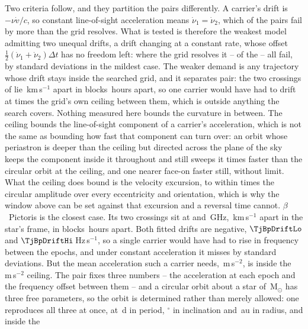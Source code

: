 Two criteria follow, and they partition the pairs differently. A carrier's
drift is $-\nu\dot v/c$, so constant line-of-sight acceleration means
$\dot\nu_1=\dot\nu_2$, which \TjNUneqDrift{} of the \TjNPair{} pairs fail
by more than the grid resolves. What is tested is therefore the weakest model
admitting two unequal drifts, a drift changing at a constant rate, whose
offset $\frac{1}{2}(\dot\nu_1+\dot\nu_2)\Delta t$ has no freedom left:
where the grid resolves it -- \TjNPower{} of the \TjNPair{} -- all
\TjNPower{} fail, by \TjSigMin{} standard deviations in the mildest case. The weaker
demand is any trajectory whose drift stays inside the searched grid, and it
separates \TjNExcl{} pair: the two crossings of \EcGridStar{} lie
\EcGridDvKms\,km\,s$^{-1}$ apart in blocks \EcGridDtH\,hours apart, so one
carrier would have had to drift at \EcGridFactor{} times the grid's own
ceiling between them, which is outside anything the search covers. Nothing
measured here bounds the curvature in between. The ceiling bounds the
line-of-sight component of a carrier's acceleration, which is not the same as
bounding how fast that component can turn over: an orbit whose periastron is
deeper than the ceiling but directed across the plane of the sky keeps the
component inside it throughout and still sweeps it \EcRateSupFac{} times
faster than the circular orbit at the ceiling, and one nearer face-on faster
still, without limit. What the ceiling does bound is the velocity
excursion, to within \EcVsupFac{} times the circular amplitude over every
eccentricity and orientation, which is why the window above can be set against
that excursion and a reversal time cannot.
$\beta$~Pictoris is the closest case. Its two crossings sit at \TjBpNuLo{}
and \TjBpNuHi\,GHz, \TjBpDvKms\,km\,s$^{-1}$ apart in the star's frame, in
blocks \TjBpDtH\,hours apart. Both fitted drifts are negative,
$\TjBpDriftLo$ and $\TjBpDriftHi$\,Hz\,s$^{-1}$, so a single carrier would
have had to rise in frequency between the epochs, and under constant
acceleration it misses by \TjBpNSig{} standard deviations. But the mean
acceleration such a carrier needs, \TjBpAccelReq\,m\,s$^{-2}$, is inside the
\WdAGrid\,m\,s$^{-2}$ ceiling. The pair fixes three numbers -- the
acceleration at each epoch and the frequency offset between them -- and a
circular orbit about a star of \EcMassBp\,M$_\odot$ \citep{Crifo1997} has
three free parameters, so the orbit is determined rather than merely
allowed: one reproduces all three at once, at \ObDayBp\,d in period,
\ObIncBp$^\circ$ in inclination and \ObAuBp\,au in radius, and inside the
